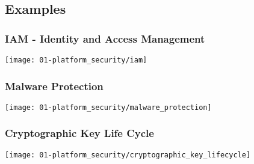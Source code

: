 \subsection{Examples}

\subsubsection{IAM - Identity and Access Management}
\begin{center}
    \vspace{-8pt}
    \texttt{[image: 01-platform\_security/iam]}
    \vspace{-8pt}
\end{center}

\subsubsection{Malware Protection}
\begin{center}
    \vspace{-8pt}
    \texttt{[image: 01-platform\_security/malware\_protection]}
    \vspace{-8pt}
\end{center}

\subsubsection{Cryptographic Key Life Cycle}
\begin{center}
    \vspace{-8pt}
    \texttt{[image: 01-platform\_security/cryptographic\_key\_lifecycle]}
    \vspace{-8pt}
\end{center}



